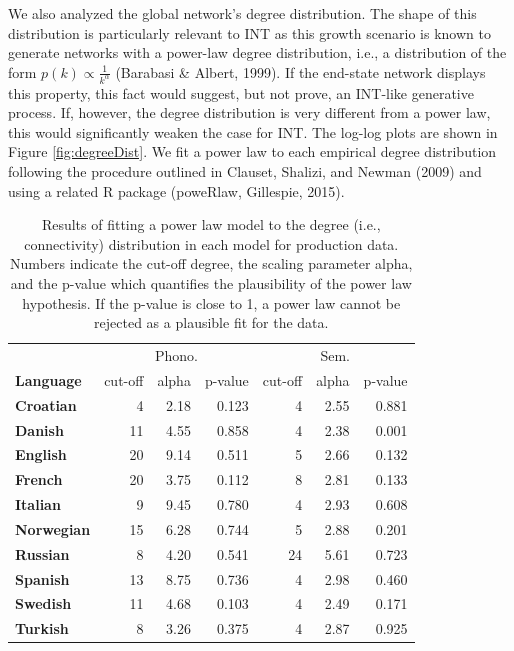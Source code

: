 \documentclass[english,floatsintext,man]{apa6}
\theoremstyle{definition}
\theoremstyle{definition}
\theoremstyle{definition}
\theoremstyle{remark}
\begin{document}
We also analyzed the global network's degree distribution. The shape of
this distribution is particularly relevant to INT as this growth
scenario is known to generate networks with a power-law degree
distribution, i.e., a distribution of the form
\(p(k) \propto \frac{1}{k^{\alpha}}\) (Barabasi \& Albert, 1999). If the
end-state network displays this property, this fact would suggest, but
not prove, an INT-like generative process. If, however, the degree
distribution is very different from a power law, this would
significantly weaken the case for INT. The log-log plots are shown in
Figure \ref{fig:degreeDist}. We fit a power law to each empirical degree
distribution following the procedure outlined in Clauset, Shalizi, and
Newman (2009) and using a related R package (poweRlaw, Gillespie, 2015).

\begin{table}

\caption{\label{tab:powerLawProd}Results of fitting a power law model to the degree (i.e., connectivity) distribution in each model for production data. Numbers indicate the cut-off degree, the scaling parameter alpha, and the p-value which quantifies the plausibility of the power law hypothesis. If the p-value is close to 1, a power law cannot be rejected as a plausible fit for the data.}
\centering
\begin{tabular}[t]{>{\bfseries}lrrrrrr}
\toprule
\multicolumn{1}{c}{} & \multicolumn{3}{c}{Phono.} & \multicolumn{3}{c}{Sem.} \\
\cmidrule(l{2pt}r{2pt}){2-4} \cmidrule(l{2pt}r{2pt}){5-7}
Language & cut-off & alpha & p-value & cut-off & alpha & p-value\\
\midrule
Croatian & 4 & 2.18 & 0.123 & 4 & 2.55 & 0.881\\
Danish & 11 & 4.55 & 0.858 & 4 & 2.38 & 0.001\\
English & 20 & 9.14 & 0.511 & 5 & 2.66 & 0.132\\
French & 20 & 3.75 & 0.112 & 8 & 2.81 & 0.133\\
Italian & 9 & 9.45 & 0.780 & 4 & 2.93 & 0.608\\
Norwegian & 15 & 6.28 & 0.744 & 5 & 2.88 & 0.201\\
Russian & 8 & 4.20 & 0.541 & 24 & 5.61 & 0.723\\
Spanish & 13 & 8.75 & 0.736 & 4 & 2.98 & 0.460\\
Swedish & 11 & 4.68 & 0.103 & 4 & 2.49 & 0.171\\
Turkish & 8 & 3.26 & 0.375 & 4 & 2.87 & 0.925\\
\bottomrule
\end{tabular}
\end{table}
\end{document}
